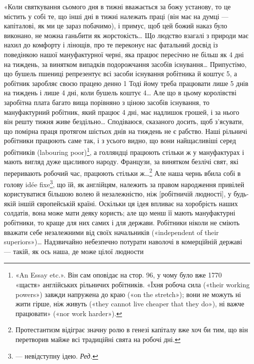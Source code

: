 «Коли святкування сьомого дня в тижні вважається за божу
установу, то це містить у собі те, що інші дні в тижні належать
праці (він має на думці — капіталові, як ми це зараз побачимо),
і примус, щоб цей божий наказ було виконано, не можна ганьбити
як жорстокість\dots{} Що людство взагалі з природи має нахил до
комфорту і лінощів, про те переконує нас фатальний досвід із
поведінкою нашої мануфактурної черні, яка працює пересічно
не більш як 4 дні на тиждень, за винятком випадків подорожчання
засобів існування\dots{} Припустімо, що бушель пшениці репрезентує
всі засоби існування робітника й коштує 5, а робітник
заробляє своєю працею денно 1 Тоді йому треба працювати
лише 5 днів на тиждень і лише 4 дні, коли бушель коштує
4\dots{} Але що в цьому королівстві заробітна плата багато
вища порівняно з ціною засобів існування, то мануфактурний
робітник, який працює 4 дні, має надлишок грошей, і за нього
він решту тижня живе бездільно\dots{} Сподіваюся, сказаного досить,
щоб з’ясувати, що помірна праця протягом шістьох днів на тиждень
не є рабство. Наші рільничі робітники працюють саме так,
і з усього видно, що вони найщасливіші серед робітників (labouring
poor)\footnote{
«An Essay etc.». Він сам оповідає на стор. 96, у чому було вже
1770~ «щастя» англійських рільничих робітників. «Їхня робоча сила
(«their working powers») завжди напружена до краю («on the stretch»);
вони не можуть ні жити гірше, ніж живуть («they cannot live cheaper
that they do»), ні важче працювати» («nor work harder»).
}, а голляндці працюють стільки ж у мануфактурах і мають
вигляд дуже щасливого народу. Французи, за винятком безлічі
свят, які переривають робочий час, працюють стільки ж\dots{}\footnote{
Протестантизм відіграє значну ролю в генезі капіталу вже хоч
би тим, що він перетворив майже всі традиційні свята на робочі дні.
}
Але наша чернь вбила собі в голову idée fixe\footnote*{
— невідступну ідею. \emph{Ред.}
}, що їй, як англійцям,
належить за правом народження привілей користуватися більшою
волею й незалежністю, ніж [робітничій людності], у будь-якій
іншій європейській країні. Оскільки ця ідея впливає на
хоробрість наших солдатів, вона може мати деяку користь; але
що менш її мають мануфактурні робітники, то краще для них
самих і для держави. Робітники ніколи не сміють вважати себе
незалежними від своїх начальників («independent of their superiors»)\dots{}
Надзвичайно небезпечно потурати наволочі в комерційній
державі — такій, як ось наша, де може  цілої людности
